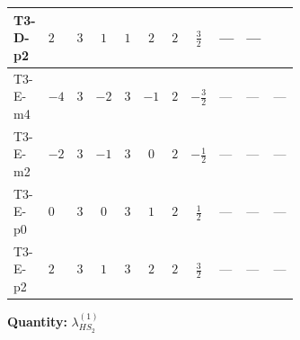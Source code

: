 \documentclass[8pt]{article}
\begin{document}
\begin{landscape}
\begin{longtable}{@{}llcccccc >{\raggedright\arraybackslash}p{0.21\linewidth} >{\raggedright\arraybackslash}p{0.21\linewidth} >{\raggedright\arraybackslash}p{0.21\linewidth}@{}}
\midrule
T3-D-p2 & $2$ & $3$ & $1$ & $1$ & $2$ & $2$ & $\frac{3}{2}$ & --- & --- & \scriptsize\adjustbox{max width=\linewidth}{$\begin{gathered} {\lambda_{HS_2}^{(1)}} (4 T_{\nu}^{(2)}+6 \operatorname{Tr}\!\left({Y_d}\,\left({Y_d}\right)^{\dagger}\right)+2 \operatorname{Tr}\!\left({Y_e}\,\left({Y_e}\right)^{\dagger}\right)+6 \operatorname{Tr}\!\left({Y_u}\,\left({Y_u}\right)^{\dagger}\right))\end{gathered}$} \\
\midrule
T3-E-m4 & $-4$ & $3$ & $-2$ & $3$ & $-1$ & $2$ & $-\frac{3}{2}$ & --- & --- & --- \\
\midrule
T3-E-m2 & $-2$ & $3$ & $-1$ & $3$ & $0$ & $2$ & $-\frac{1}{2}$ & --- & --- & --- \\
\midrule
T3-E-p0 & $0$ & $3$ & $0$ & $3$ & $1$ & $2$ & $\frac{1}{2}$ & --- & --- & --- \\
\midrule
T3-E-p2 & $2$ & $3$ & $1$ & $3$ & $2$ & $2$ & $\frac{3}{2}$ & --- & --- & --- \\
\midrule
\bottomrule
\end{longtable}
\clearpage
\noindent\textbf{Quantity: }$\lambda_{HS_2}^{(1)}$\par\smallskip

\end{landscape}
\end{document}
